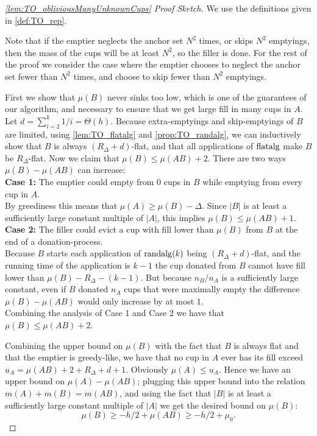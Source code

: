 \begin{proof}[\cref{lem:TO_obliviousManyUnknownCups} Proof Sketch] 
  We use the definitions given in \cref{def:TO_rep}.

  Note that if the emptier neglects the anchor set $N^2$ times,
  or skips $N^2$ emptyings, then the mass of the cups will be at
  least $N^2$, so the filler is done. For the rest of the proof
  we consider the case where the emptier chooses to neglect
  the anchor set fewer than $N^2$ times, and choose to skip fewer
  than $N^2$ emptyings.

First we show that $\mu(B)$ never sinks too low, which is one of
the guarantees of our algorithm, and necessary to ensure that we
get large fill in many cups in $A$. 
Let $d = \sum_{i=2}^k 1/i =
\Theta(h)$. Because extra-emptyings and skip-emptyings of $B$ are
limited, using \cref{lem:TO_flatalg} and
\cref{prop:TO_randalg}, we can inductively show that $B$ is
always $(R_\Delta + d)$-flat, and that all applications of
$\operatorname{\text{\textup{flatalg}}}$ make $B$ be $R_\Delta$-flat. Now we claim that
$\mu(B) \le \mu(AB) + 2.$ There are two ways $\mu(B) - \mu(AB)$
can increase:\\
\textbf{Case 1:}
The emptier could empty from $0$ cups in $B$ while emptying
from every cup in $A$. \\
By greediness this means that $\mu(A) \ge \mu(B) - \Delta$. Since
$|B|$ is at least a sufficiently large constant multiple of
$|A|$, this implies $\mu(B) \le \mu(AB) + 1$.\\
\textbf{Case 2:}
The filler could evict a cup with fill lower than $\mu(B)$ from
$B$ at the end of a donation-process. \\ Because $B$ starts each
application of $\operatorname{\text{\textup{randalg}}}(k)$ being $(R_\Delta + d)$-flat, and the
running time of the application is $k-1$ the cup donated from $B$
cannot have fill lower than $\mu(B) - R_\Delta - (k-1)$. But
because $n_B/n_A$ is a sufficiently large constant, even if $B$
donated $n_A$ cups that were maximally empty the difference
$\mu(B)-\mu(AB)$ would only increase by at most $1$.\\ Combining
the analysis of Case 1 and Case 2 we have that $\mu(B) \le
\mu(AB) + 2$.

Combining the upper bound on $\mu(B)$ with the fact that $B$ is
always flat and that the emptier is greedy-like, we have that no
cup in $A$ ever has its fill exceed $u_A = \mu(AB) + 2 + R_\Delta
+ d + 1.$ Obviously $\mu(A)\le u_A$. Hence we have an upper bound
on $\mu(A)-\mu(AB)$; plugging this upper bound into the relation
$m(A) + m(B) = m(AB)$, and using the fact that $|B|$ is at least
a sufficiently large constant multiple of $|A|$ we get the
desired bound on $\mu(B)$:
$$\mu(B) \ge -h/2 + \mu(AB) \ge -h/2 + \mu_0.$$


\end{proof}
